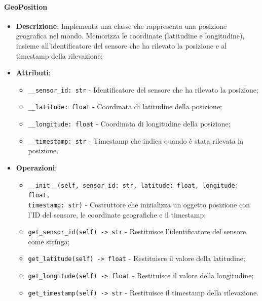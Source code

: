 \documentclass[10pt]{article}
\begin{document}
    \paragraph{GeoPosition}
    \begin{itemize} 
    \item \textbf{Descrizione}: Implementa una classe che rappresenta una posizione geografica nel mondo. Memorizza le coordinate (latitudine e longitudine), insieme all'identificatore del sensore che ha rilevato la posizione e al timestamp della rilevazione;
    \item \textbf{Attributi}:
    \begin{itemize}
        \item \texttt{\_\_sensor\_id: str} - Identificatore del sensore che ha rilevato la posizione;
        \item \texttt{\_\_latitude: float} - Coordinata di latitudine della posizione;
        \item \texttt{\_\_longitude: float} - Coordinata di longitudine della posizione;
        \item \texttt{\_\_timestamp: str} - Timestamp che indica quando è stata rilevata la posizione.
    \end{itemize}
    
    \item \textbf{Operazioni}:
    \begin{itemize}
        \item \texttt{\_\_init\_\_(self, sensor\_id: str, latitude: float, longitude: float, \\ timestamp: str)} - Costruttore che inizializza un oggetto posizione con l'ID del sensore, le coordinate geografiche e il timestamp;
        
        \item \texttt{get\_sensor\_id(self) -> str} - Restituisce l'identificatore del sensore come stringa;
        
        \item \texttt{get\_latitude(self) -> float} - Restituisce il valore della latitudine;
        
        \item \texttt{get\_longitude(self) -> float} - Restituisce il valore della longitudine;
        
        \item \texttt{get\_timestamp(self) -> str} - Restituisce il timestamp della rilevazione.
    \end{itemize}
    \end{itemize}
\end{document}
